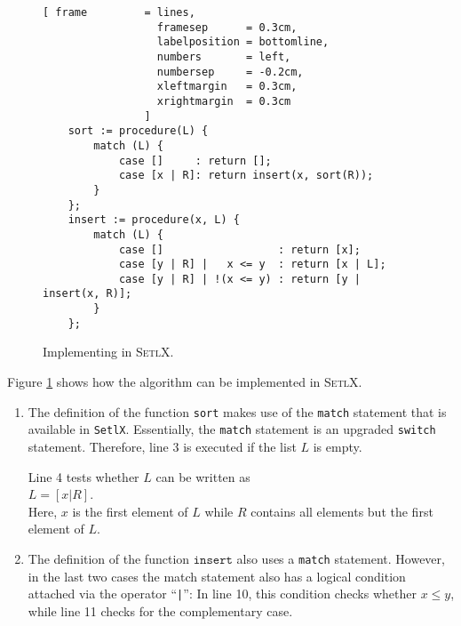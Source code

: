 \begin{figure}[!ht]
  \centering
\begin{Verbatim}[ frame         = lines, 
                  framesep      = 0.3cm, 
                  labelposition = bottomline,
                  numbers       = left,
                  numbersep     = -0.2cm,
                  xleftmargin   = 0.3cm,
                  xrightmargin  = 0.3cm
                ]
    sort := procedure(L) {
        match (L) {
            case []     : return [];
            case [x | R]: return insert(x, sort(R));
        }
    };
    insert := procedure(x, L) {
        match (L) {
            case []                  : return [x];
            case [y | R] |   x <= y  : return [x | L];
            case [y | R] | !(x <= y) : return [y | insert(x, R)];
        }
    };
\end{Verbatim}
\vspace*{-0.3cm}
  \caption{Implementing  in \textsc{SetlX}.}
  \label{fig:insertion-sort.stlx}
\end{figure} 

\noindent
Figure \ref{fig:insertion-sort.stlx} shows how the  algorithm can be implemented 
in \textsc{SetlX}.
\begin{enumerate}
\item The definition of the function \texttt{sort} makes use of the \texttt{match} statement
      that is available in \texttt{SetlX}.  Essentially, the \texttt{match} statement is an upgraded
      \texttt{switch} statement.  Therefore, line 3 is executed if the list $L$ is empty.

      Line 4 tests whether $L$ can be written as  
      \\[0.2cm]
      \hspace*{1.3cm}
      $L = [x | R]$.
      \\[0.2cm]
      Here, $x$ is the first element of $L$ while $R$ contains all elements but the first element of $L$.  
\item The definition of the function $\mathtt{insert}$ also uses a 
      \texttt{match} statement.  However, in the last two cases the match statement
      also has a logical condition attached via the operator ``\texttt{|}'':
      In line 10, this condition checks whether $x \leq y$, while line 11 checks for the
      complementary case.
\end{enumerate}

